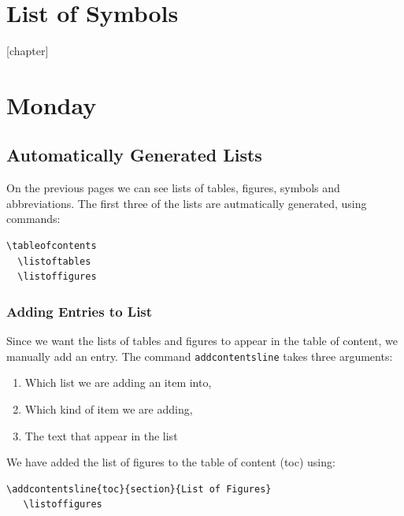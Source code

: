 \documentclass[a4paper,10pt]{report} %
\begin{document}
    \chapter*{List of Symbols}
       

\setcounter{chapter}{1}
\setcounter{figure}{1} 

\newpage

\setcounter{chapter}{2}
[chapter]
\chapter{Monday} 

\section{Automatically Generated Lists}\label{sec:automatic}
On the previous pages we can see lists of tables, figures, symbols and abbreviations. The first three of the lists are autmatically generated, using commands:

\begin{lstlisting}[language={[latex]tex}, frame=single,basicstyle=\footnotesize]
  \tableofcontents
  \listoftables
  \listoffigures
\end{lstlisting}

\subsection{Adding Entries to List}
 Since we want the lists of tables and figures to appear in the table of content, we manually add an entry. The command \texttt{addcontentsline} takes three arguments:
 \begin{enumerate}[label=\arabic*)]
  \item Which list we are adding an item into,
  \item Which kind of item we are adding,
  \item The text that appear in the list
 \end{enumerate}

 We have added the list of figures to the table of content (toc) using: 
 \begin{lstlisting}[language={[latex]tex}, frame=single,basicstyle=\footnotesize]
   \addcontentsline{toc}{section}{List of Figures} 
   \listoffigures
\end{lstlisting}
\end{document}
